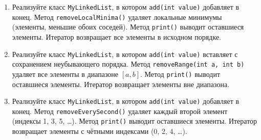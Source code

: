 \documentclass[12pt]{article}
\begin{document}
\begin{enumerate}
\item Реализуйте класс \texttt{MyLinkedList}, в котором \texttt{add(int value)} добавляет в конец. Метод \texttt{removeLocalMinima()} удаляет локальные минимумы (элементы, меньшие обоих соседей). Метод \texttt{print()} выводит оставшиеся элементы. Итератор возвращает все элементы в исходном порядке.

\item Реализуйте класс \texttt{MyLinkedList}, в котором \texttt{add(int value)} вставляет с сохранением неубывающего порядка. Метод \texttt{removeRange(int a, int b)} удаляет все элементы в диапазоне $[a, b]$. Метод \texttt{print()} выводит оставшиеся элементы. Итератор возвращает элементы вне диапазона.

\item Реализуйте класс \texttt{MyLinkedList}, в котором \texttt{add(int value)} добавляет в конец. Метод \texttt{removeEverySecond()} удаляет каждый второй элемент (индексы 1, 3, 5, …). Метод \texttt{print()} выводит оставшиеся элементы. Итератор возвращает элементы с чётными индексами (0, 2, 4, …).
\end{enumerate}
\end{document}
